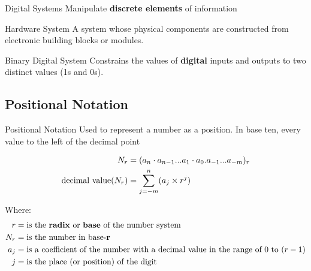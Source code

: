 \documentclass[12pt]{article}
\begin{document}
\begin{definition}{Digital Systems}
  Manipulate \textbf{discrete elements} of information
\end{definition}

\begin{definition}{Hardware System}
  A system whose physical components are constructed from electronic building blocks or modules.
\end{definition}

\begin{definition}{Binary Digital System}
  Constrains the values of \textbf{digital} inputs and outputs to two distinct values (1s and 0s).
\end{definition}

\subsection{Positional Notation}
\label{ssec:positionalNotation}

\begin{definition}{Positional Notation}
  Used to represent a number as a position. In base ten, every value to the left of the 
  decimal point

  \begin{align*}
    N_r &= (a_n \cdot a_{n-1} ... a_1 \cdot a_0 . a_{-1} ... a_{-m})_r \\
    \textup{decimal value($N_r$)} &= \sum_{j=-m}^{n} (a_j \times r^j)
  \end{align*}

  Where:
  \begin{align*}
    r   &= \textup{is the \textbf{radix} or \textbf{base} of the number system} \\
    N_r &= \textup{is the number in base-\textbf{r}} \\
    a_j &= \textup{is a coefficient of the number with a decimal value in the range of $0$ to $(r-1)$} \\
    j   &= \textup{is the place (or position) of the digit}
  \end{align*}
\end{definition}
\end{document}
